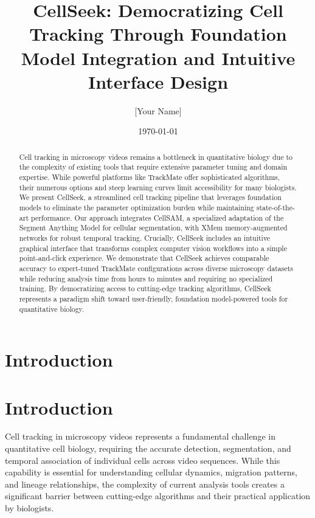 \documentclass[12pt]{article}
\title{CellSeek: Democratizing Cell Tracking Through Foundation Model Integration and Intuitive Interface Design}
\author{[Your Name]}
\date{\today}
\begin{document}
\maketitle

\begin{abstract}
Cell tracking in microscopy videos remains a bottleneck in quantitative biology due to the complexity of existing tools that require extensive parameter tuning and domain expertise. While powerful platforms like TrackMate offer sophisticated algorithms, their numerous options and steep learning curves limit accessibility for many biologists. We present CellSeek, a streamlined cell tracking pipeline that leverages foundation models to eliminate the parameter optimization burden while maintaining state-of-the-art performance. Our approach integrates CellSAM, a specialized adaptation of the Segment Anything Model for cellular segmentation, with XMem memory-augmented networks for robust temporal tracking. Crucially, CellSeek includes an intuitive graphical interface that transforms complex computer vision workflows into a simple point-and-click experience. We demonstrate that CellSeek achieves comparable accuracy to expert-tuned TrackMate configurations across diverse microscopy datasets while reducing analysis time from hours to minutes and requiring no specialized training. By democratizing access to cutting-edge tracking algorithms, CellSeek represents a paradigm shift toward user-friendly, foundation model-powered tools for quantitative biology.
\end{abstract}


\section{Introduction}

\section{Introduction}

Cell tracking in microscopy videos represents a fundamental challenge in quantitative cell biology, requiring the accurate detection, segmentation, and temporal association of individual cells across video sequences. While this capability is essential for understanding cellular dynamics, migration patterns, and lineage relationships, the complexity of current analysis tools creates a significant barrier between cutting-edge algorithms and their practical application by biologists.
\end{document}
